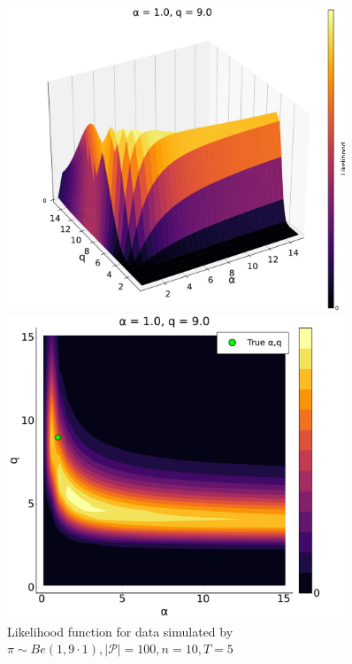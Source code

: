 \documentclass[a4paper, 12pt]{article}
\begin{document}
\begin{figure}
    \centering
    \begin{minipage}{0.55\textwidth}
        \centering
        \includegraphics[width=0.9\textwidth]{../figures/Likelihood_sfplt_1.0.pdf} %
    \end{minipage}\hfill
    \begin{minipage}{0.45\textwidth}
        \centering
        \includegraphics[width=0.9\textwidth]{../figures/Likelihood_contplt_1.0.pdf} %
    \end{minipage}
    \caption{\small Likelihood function for data simulated by $\pi \sim Be(1, 9 \cdot 1), |\mathcal{P}| = 100, n = 10, T = 5$}
\end{figure}
\end{document}
